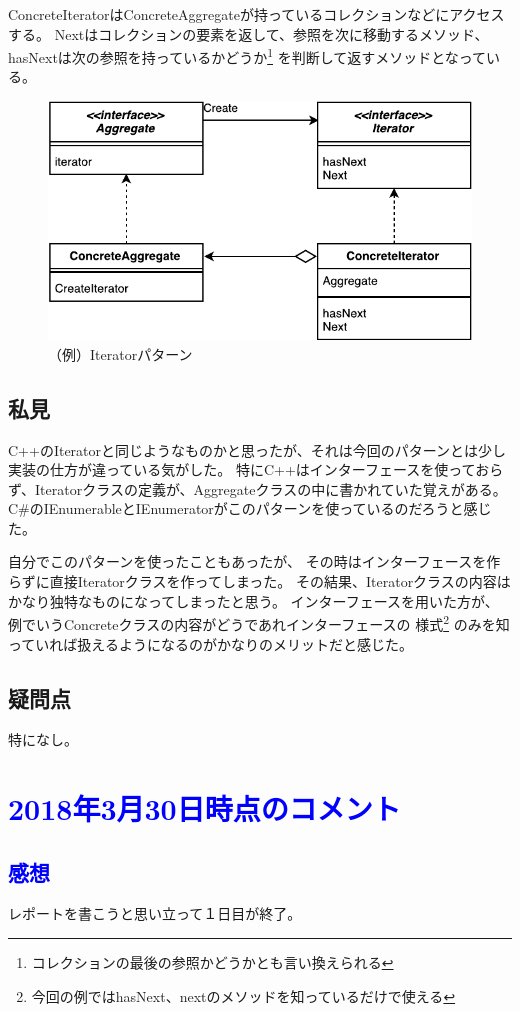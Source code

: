 \documentclass[11pt]{jsarticle}
\begin{document}
		ConcreteIteratorはConcreteAggregateが持っているコレクションなどにアクセスする。
		Nextはコレクションの要素を返して、参照を次に移動するメソッド、
		hasNextは次の参照を持っているかどうか\footnote{コレクションの最後の参照かどうかとも言い換えられる}
		を判断して返すメソッドとなっている。
	
		\begin{figure}[htbp]
			\centering
			\includegraphics[width=0.7\hsize]{IteratorPattern-crop.pdf}
			\caption{（例）Iteratorパターン}\label{fig::iterator}
		\end{figure}
		
	\subsection{私見}
		C++のIteratorと同じようなものかと思ったが、それは今回のパターンとは少し実装の仕方が違っている気がした。
		特にC++はインターフェースを使っておらず、Iteratorクラスの定義が、Aggregateクラスの中に書かれていた覚えがある。
		C\#のIEnumerableとIEnumeratorがこのパターンを使っているのだろうと感じた。
		
		自分でこのパターンを使ったこともあったが、
		その時はインターフェースを作らずに直接Iteratorクラスを作ってしまった。
		その結果、Iteratorクラスの内容はかなり独特なものになってしまったと思う。
		インターフェースを用いた方が、例でいうConcreteクラスの内容がどうであれインターフェースの
		様式\footnote{今回の例ではhasNext、nextのメソッドを知っているだけで使える}
		のみを知っていれば扱えるようになるのがかなりのメリットだと感じた。
	\subsection{疑問点}
		特になし。
	\section*{\textcolor{blue}{2018年3月30日時点のコメント}}
		\subsection*{\textcolor{blue}{感想}}
			レポートを書こうと思い立って１日目が終了。
			
\end{document}
